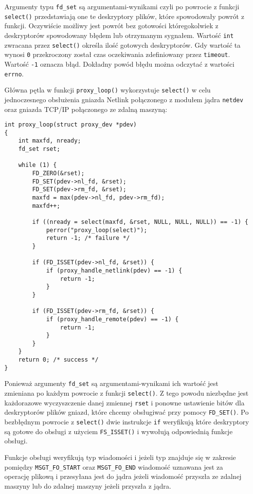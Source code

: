 Argumenty typu \texttt{fd\_set} są argumentami-wynikami czyli po
powrocie z funkcji \texttt{select()} przedstawiają one te deskryptory
plików, które spowodowały powrót z funkcji. Oczywiście możliwy jest
powrót bez gotowości któregokolwiek z deskryptorów spowodowany błędem
lub otrzymanym sygnałem. Wartość \texttt{int} zwracana przez
\texttt{select()} określa ilość gotowych deskryptorów. Gdy wartość ta
wynosi \texttt{0} przekroczony został czas oczekiwania zdefiniowany
przez \texttt{timeout}. Wartość \texttt{-1} oznacza błąd. Dokładny powód
błędu można odczytać z wartości \texttt{errno}.

Główna pętla w funkcji \texttt{proxy\_loop()} wykorzystuje
\texttt{select()} w celu jednoczesnego obsłużenia gniazda Netlink
połączonego z modułem jądra \texttt{netdev} oraz gniazda TCP/IP
połączonego ze zdalną maszyną:

\begin{verbatim}
int proxy_loop(struct proxy_dev *pdev)
{
    int maxfd, nready;
    fd_set rset;

    while (1) {
        FD_ZERO(&rset);
        FD_SET(pdev->nl_fd, &rset);
        FD_SET(pdev->rm_fd, &rset);
        maxfd = max(pdev->nl_fd, pdev->rm_fd);
        maxfd++;

        if ((nready = select(maxfd, &rset, NULL, NULL, NULL)) == -1) {
            perror("proxy_loop(select)");
            return -1; /* failure */
        }

        if (FD_ISSET(pdev->nl_fd, &rset)) {
            if (proxy_handle_netlink(pdev) == -1) {
                return -1;
            }
        }

        if (FD_ISSET(pdev->rm_fd, &rset)) {
            if (proxy_handle_remote(pdev) == -1) {
                return -1;
            }
        }
    }
    return 0; /* success */
}
\end{verbatim}

Ponieważ argumenty \texttt{fd\_set} są argumentami-wynikami ich wartość
jest zmieniana po każdym powrocie z funkcji \texttt{select()}. Z tego
powodu niezbędne jest każdorazowe wyczyszczenie danej zmiennej
\texttt{rset} i ponowne ustawienie bitów dla deskryptorów plików gniazd,
które chcemy obsługiwać przy pomocy \texttt{FD\_SET()}. Po bezbłędnym
powrocie z \texttt{select()} dwie instrukcje \texttt{if} weryfikują
które deskryptory są gotowe do obsługi z użyciem \texttt{FS\_ISSET()} i
wywołują odpowiednią funkcje obsługi.

Funkcje obsługi weryfikują typ wiadomości i jeżeli typ znajduje się w
zakresie pomiędzy \texttt{MSGT\_FO\_START} oraz \texttt{MSGT\_FO\_END}
wiadomość uznawana jest za operację plikową i przesyłana jest do jądra
jeżeli wiadomość przyszła ze zdalnej maszyny lub do zdalnej maszyny
jeżeli przyszła z jądra.

